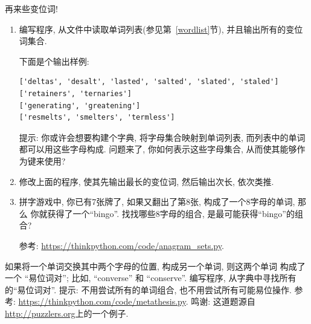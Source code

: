 \documentclass[10pt]{book}
\begin{document}
\begin{exercise}
\label{anagrams}

再来些变位词!

\begin{enumerate}

\item 编写程序, 从文件中读取单词列表(参见第~\ref{wordlist}节), 
并且输出所有的变位词集合. 

下面是个输出样例:

\begin{verbatim}
['deltas', 'desalt', 'lasted', 'salted', 'slated', 'staled']
['retainers', 'ternaries']
['generating', 'greatening']
['resmelts', 'smelters', 'termless']
\end{verbatim}
%
提示: 你或许会想要构建个字典, 将字母集合映射到单词列表, 
而列表中的单词都可以用这些字母构成. 问题来了, 你如何表示这些字母集合, 
从而使其能够作为键来使用?

\item 修改上面的程序, 使其先输出最长的变位词, 然后输出次长, 依次类推. 

\item 拼字游戏中, 你已有7张牌了, 如果又翻出了第8张, 构成了一个8字母的单词, 那么
你就获得了一个``bingo''. 找找哪些8字母的组合, 是最可能获得``bingo''的组合?


参考: \url{https://thinkpython.com/code/anagram_sets.py}.

\end{enumerate}
\end{exercise}

\begin{exercise}
如果将一个单词交换其中两个字母的位置, 构成另一个单词, 则这两个单词
构成了一个 ``易位词对''; 比如, ``converse'' 和 ``conserve''.  
编写程序, 从字典中寻找所有的``易位词对''.
提示: 不用尝试所有的单词组合, 也不用尝试所有可能易位操作. 
参考:
\url{https://thinkpython.com/code/metathesis.py}.  
鸣谢: 这道题源自\url{http://puzzlers.org}上的一个例子. 
\end{exercise}
\end{document}
